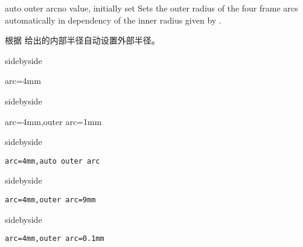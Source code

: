 \begin{docTcbKey}{auto outer arc}{}{no value, initially set}
Sets the outer radius of the four frame arcs automatically in
dependency of the inner radius given by .

根据  给出的内部半径自动设置外部半径。

\begin{dispExample*}{sidebyside}
\begin{tcolorbox}[arc=4mm]
arc=4mm
\end{tcolorbox}
\end{dispExample*}

\begin{dispExample*}{sidebyside}
\begin{tcolorbox}[arc=4mm,%
outer arc=1mm]
arc=4mm,outer arc=1mm
\end{tcolorbox}
\end{dispExample*}

\begin{dispExample*}{sidebyside}
\begin{tcolorbox}[arc=4mm,%
auto outer arc]
\verb|arc=4mm,auto outer arc|
\end{tcolorbox}
\end{dispExample*}

\begin{dispExample*}{sidebyside}
\begin{tcolorbox}[arc=4mm,%
outer arc=9mm]
\verb|arc=4mm,outer arc=9mm|
\end{tcolorbox}
\end{dispExample*}

\begin{dispExample*}{sidebyside}
\begin{tcolorbox}[arc=4mm,%
outer arc=0.1mm]
\verb|arc=4mm,outer arc=0.1mm|
\end{tcolorbox}
\end{dispExample*}
\end{docTcbKey}
  